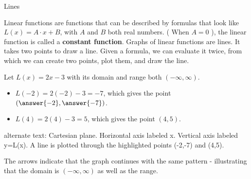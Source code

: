 \documentclass{ximera}
\begin{document}
\begin{example} Lines

Linear functions are functions that can be described by formulas that look like $L(x) = A \cdot x + B$, with $A$ and $B$ both real numbers. ( When $A = 0$ ), the linear function is called a \textbf{constant function}.   Graphs of linear functions are lines.  It takes two points to draw a line. Given a formula, we can evaluate it twice, from which we can create two points, plot them, and draw the line.

Let $L(x) = 2x-3$ with its domain and range both $(-\infty, \infty)$.

\begin{itemize}
\item $L(-2) = 2(-2) - 3 = -7$, which gives the point $\left(\answer{-2}, \answer{-7}\right)$.
\item $L(4) = 2(4) - 3 = 5$, which gives the point $(4, 5)$.
\end{itemize}






\begin{image}
\end{image}

\textcolor{gray!90}{alternate text: Cartesian plane. Horizontal axis labeled x. Vertical axis labeled y=L(x).  A line is plotted through the highlighted points (-2,-7) and (4,5).}



The arrows indicate that the graph continues with the same pattern - illustrating that the domain is $(-\infty, \infty)$ as well as the range.


\end{example}
\end{document}
